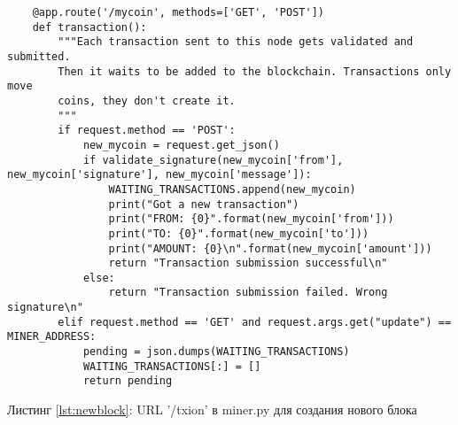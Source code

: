 \begin{center}
\begin{lstlisting}
    @app.route('/mycoin', methods=['GET', 'POST'])
    def transaction():
        """Each transaction sent to this node gets validated and submitted.
        Then it waits to be added to the blockchain. Transactions only move
        coins, they don't create it.
        """
        if request.method == 'POST':
            new_mycoin = request.get_json()
            if validate_signature(new_mycoin['from'], new_mycoin['signature'], new_mycoin['message']):
                WAITING_TRANSACTIONS.append(new_mycoin)
                print("Got a new transaction")
                print("FROM: {0}".format(new_mycoin['from']))
                print("TO: {0}".format(new_mycoin['to']))
                print("AMOUNT: {0}\n".format(new_mycoin['amount']))
                return "Transaction submission successful\n"
            else:
                return "Transaction submission failed. Wrong signature\n"
        elif request.method == 'GET' and request.args.get("update") == MINER_ADDRESS:
            pending = json.dumps(WAITING_TRANSACTIONS)
            WAITING_TRANSACTIONS[:] = []
            return pending
\end{lstlisting}\label{lst:newblock}
    Листинг \ref{lst:newblock}: URL '/txion' в {\small miner.py} для создания нового блока
\end{center}


